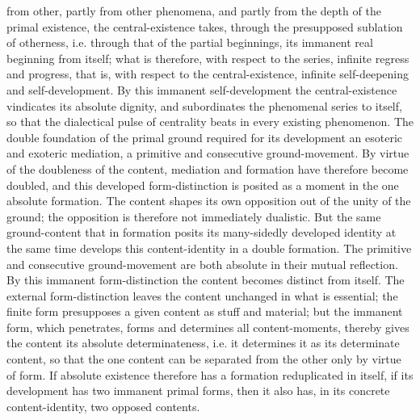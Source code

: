 \documentclass[12pt,a4paper,openany]{book}
\newcommand{\opage}[1]{\marginnote{\footnotesize\textit{[#1]}}}
\begin{document}
from other, partly from other phenomena, and partly
from the depth of the primal existence, the central-existence takes,
through the presupposed sublation of otherness, i.e. through that of the partial beginnings,
its immanent real beginning
from itself; what is therefore, with respect
to the series, infinite regress and progress, that
is, with respect to the central-existence, infinite self-deepening
and self-development. By this immanent
self-development the central-existence vindicates its absolute
dignity, and subordinates the phenomenal series to itself, so that the dialectical pulse of centrality beats
in every existing phenomenon. The double foundation of the primal ground required for its development
an esoteric and exoteric mediation, a primitive
and consecutive ground-movement. By virtue of the
doubleness of the content, mediation and
\setcounter{footnote}{0}%
\opage{169}formation have therefore become doubled, and this developed
form-distinction is posited as a moment in the one absolute
formation. The content shapes its own opposition
out of the unity of the ground; the opposition is therefore
not immediately dualistic. But the same ground-content
that in formation posits its many-sidedly developed
identity at the same time develops this content-identity
in a double formation. The primitive and
consecutive ground-movement are both absolute in their mutual
reflection. By this immanent
form-distinction the content becomes distinct from itself.
The external form-distinction leaves the content
unchanged in what is essential; the finite form presupposes
a given content as stuff and material; but
the immanent form, which penetrates, forms
and determines all content-moments, thereby gives
the content its absolute determinateness, i.e. it determines
it as its determinate content, so that the one
content can be separated from the other only by virtue of form.
If absolute existence therefore has a formation
reduplicated in itself, if its development has two
immanent primal forms, then it also has, in its concrete content-identity, two opposed contents.
\end{document}
